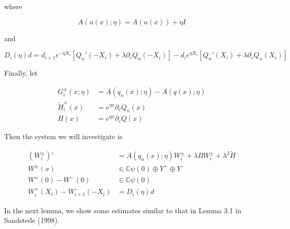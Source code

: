 \documentclass[12pt]{article}
\def\C{{\mathbb C}}
\begin{document}
where

\begin{equation}\label{Aeta}
A(u(x); \eta) = A(u(x)) + \eta I
\end{equation}

and

\begin{equation}\label{Did}
D_i(\eta) d = d_{i+1} e^{-\eta X_i}[ Q_n'(-X_i) + \lambda \partial_c Q_n(-X_i)] 
- d_i e^{\eta X_i}[ Q_n'(X_i) + \lambda \partial_c Q_n(X_i)] 
\end{equation}

Finally, let 

\begin{align*}
G_i^\pm(x; \eta) &= A(q_n(x); \eta) - A(q(x); \eta) \\
\tilde{H}_i^\pm(x) &= e^{\eta x} \partial_c Q_n(x) \\
H(x) &= e^{\eta x} \partial_c Q(x)
\end{align*}

Then the system we will investigate is

\begin{align*}
(W_i^\pm)' &= A(q_n(x); \eta) W_i^\pm + \lambda B W_i^\pm + \lambda^2 \tilde{H} \\
W^\pm(x) &\in \C \psi(0) \oplus Y^+ \oplus Y^- \\
W^+(0) - W^-(0) &\in \C \psi(0) \\
W_i^+(X_i) - W_{i+1}^-(-X_i) &= D_i(\eta) d
\end{align*}

In the next lemma, we show some estimates similar to that in Lemma 3.1 in Sandstede (1998).

\end{document}
